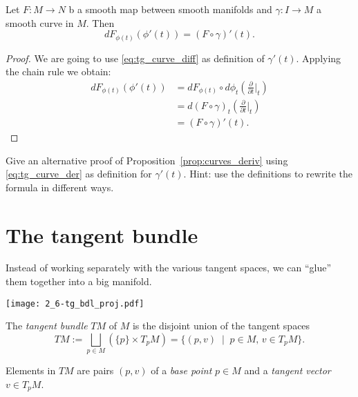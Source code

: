 \begin{proposition}\label{prop:curves_deriv}
  Let $F:M\to N$ b a smooth map between smooth manifolds and $\gamma:I\to M$ a smooth curve in $M$.
  Then
  \begin{equation}
    d F_{\phi(t)} (\phi'(t)) = (F\circ\gamma)'(t).
  \end{equation}
\end{proposition}
\begin{proof}
  We are going to use \eqref{eq:tg_curve_diff} as definition of $\gamma'(t)$.
  Applying the chain rule we obtain:
  \begin{align}
    d F_{\phi(t)} (\phi'(t))
    &= d F_{\phi(t)} \circ d\phi_t \left(\frac{\partial}{\partial t}\Big|_t\right) \\
    &= d (F\circ\gamma)_t \left(\frac{\partial}{\partial t}\Big|_t\right) \\
    &= (F\circ\gamma)'(t).
  \end{align}
\end{proof}

\begin{exercise}
  Give an alternative proof of Proposition~\ref{prop:curves_deriv} using \eqref{eq:tg_curve_der} as definition for $\gamma'(t)$.
  Hint: use the definitions to rewrite the formula in different ways.
\end{exercise}

\section{The tangent bundle}\label{sec:tangentbundle}

Instead of working separately with the various tangent spaces, we can ``glue'' them together into a big manifold.

\begin{marginfigure}
  \texttt{[image: 2\_6-tg\_bdl\_proj.pdf]}
\end{marginfigure}
\begin{definition}
  The \emph{tangent bundle} $TM$ of $M$ is the disjoint union of the tangent spaces
  \begin{equation}
    TM := \bigsqcup_{p\in M}\left(\{p\}\times T_pM\right)
       = \{(p,v) \;\mid\; p\in M,\, v\in T_pM\}.
  \end{equation}  
\end{definition}

Elements in $TM$ are pairs $(p,v)$ of a \emph{base point} $p\in M$ and a \emph{tangent vector} $v\in T_pM$.

